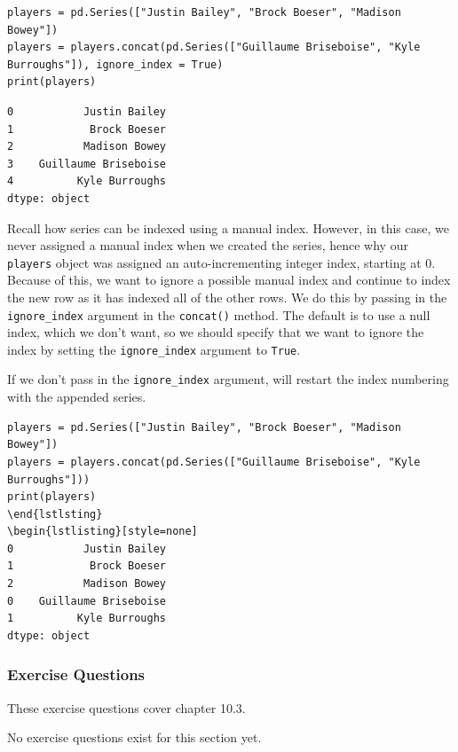 \begin{lstlisting}[style=pippython]
players = pd.Series(["Justin Bailey", "Brock Boeser", "Madison Bowey"])
players = players.concat(pd.Series(["Guillaume Briseboise", "Kyle Burroughs"]), ignore_index = True)
print(players)
\end{lstlisting}
\begin{lstlisting}[style=none]
0           Justin Bailey
1            Brock Boeser
2           Madison Bowey
3    Guillaume Briseboise
4          Kyle Burroughs
dtype: object
\end{lstlisting}
Recall how series can be indexed using a manual index. However, in this case, we never assigned a manual index when we created the series, hence why our \verb|players| object was assigned an auto-incrementing integer index, starting at 0. Because of this, we want  to ignore a possible manual index and continue to index the new row as it has indexed all of the other rows. We do this by passing in the \verb|ignore_index| argument in the \verb|concat()| method. The default is to use a null index, which we don't want, so we should specify that we want to ignore the index by setting the \verb|ignore_index| argument to \verb|True|.\par
If we don't pass in the \verb|ignore_index| argument,  will restart the index numbering with the appended series.\par
\begin{lstlisting}[style=pippython]
players = pd.Series(["Justin Bailey", "Brock Boeser", "Madison Bowey"])
players = players.concat(pd.Series(["Guillaume Briseboise", "Kyle Burroughs"]))
print(players)
\end{lstlsting}
\begin{lstlisting}[style=none]
0           Justin Bailey
1            Brock Boeser
2           Madison Bowey
0    Guillaume Briseboise
1          Kyle Burroughs
dtype: object
\end{lstlisting}

\subsubsection*{Exercise Questions}
These exercise questions cover chapter 10.3.

No exercise questions exist for this section yet.

